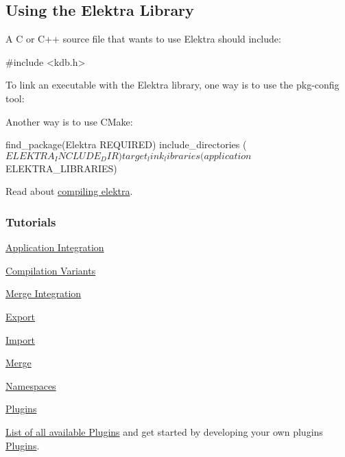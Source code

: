 \subsection*{Using the Elektra Library}

A C or C++ source file that wants to use Elektra should include\+: \begin{DoxyVerb}    #include <kdb.h>
\end{DoxyVerb}


To link an executable with the Elektra library, one way is to use the {\ttfamily pkg-\/config} tool\+: 


Another way is to use C\+Make\+: \begin{DoxyVerb}    find_package(Elektra REQUIRED)
    include_directories (${ELEKTRA_INCLUDE_DIR})
    target_link_libraries (application ${ELEKTRA_LIBRARIES})
\end{DoxyVerb}


Read about \hyperlink{doc_COMPILE_md}{compiling elektra}.

\subsubsection*{Tutorials}


\begin{DoxyItemize}
\item \hyperlink{doc_tutorials_application-integration_md}{Application Integration}
\item \hyperlink{doc_tutorials_compilation-variants_md}{Compilation Variants}
\item \hyperlink{doc_tutorials_elektra-merge-integration_md}{Merge Integration}
\item \hyperlink{doc_tutorials_export_md}{Export}
\item \hyperlink{doc_tutorials_import_md}{Import}
\item \hyperlink{doc_tutorials_merge_md}{Merge}
\item \hyperlink{doc_tutorials_namespaces_md}{Namespaces}
\item \hyperlink{doc_tutorials_plugins_md}{Plugins}
\end{DoxyItemize}

\hyperlink{md_src_plugins_README_src_plugins_README_md}{List of all available Plugins} and get started by developing your own plugins \hyperlink{group__plugin}{Plugins}.

